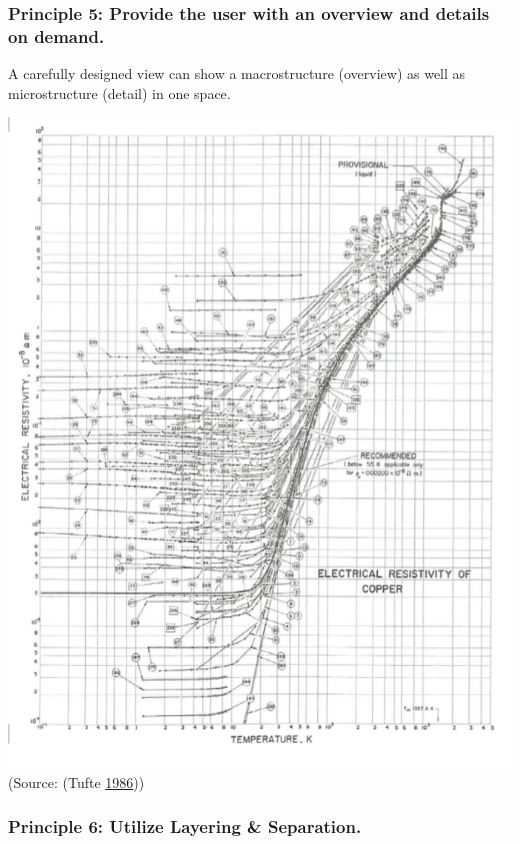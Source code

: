 \documentclass[]{book}
\begin{document}
\hypertarget{principle-5-provide-the-user-with-an-overview-and-details-on-demand.}{%
\subsubsection{Principle 5: Provide the user with an overview and details on demand.}\label{principle-5-provide-the-user-with-an-overview-and-details-on-demand.}}

A carefully designed view can show a macrostructure (overview) as well as microstructure (detail) in one space.

\includegraphics{images/Tufte_figure9.png}
(Source: (Tufte \protect\hyperlink{ref-The-Visual-Display-of-Quantitative-Information}{1986}))

\hypertarget{principle-6-utilize-layering-separation.}{%
\subsubsection{Principle 6: Utilize Layering \& Separation.}\label{principle-6-utilize-layering-separation.}}
\end{document}
